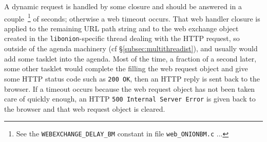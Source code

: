 A dynamic request is handled by some closure  and
should be answered in a couple~\footnote{See the
  \texttt{WEBEXCHANGE\_DELAY\_BM} constant in file
  \texttt{web\_ONIONBM.c} ...} of seconds; otherwise a  web timeout  occurs. That web handler
 closure is applied to the remaining URL path
string and to the web exchange object created in the
\texttt{libonion}-specific thread dealing with the HTTP request, so
outside of the agenda machinery (cf §\ref{subsec:multithreadist}), and
usually would add some  tasklet into the 
agenda. Most of the time, a fraction of a second later, some other
tasklet would complete the filling the web request object and give
some HTTP status code such as \texttt{200 OK}, then an HTTP reply is
sent back to the browser. If a timeout occurs because the web request
object has not been taken care of quickly enough, an HTTP \texttt{500
  Internal Server Error} is given back to the browser and that web
request object is cleared.

